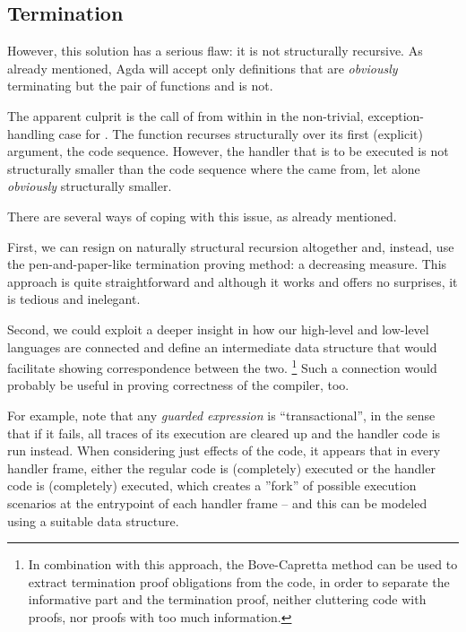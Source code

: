 \subsection{Termination}

However, this solution has a serious flaw: it is not structurally recursive.
As already mentioned, Agda will accept only definitions that are \emph{obviously}
terminating but the pair of functions  and 
is not.

The apparent culprit is the call of  from within
 in the non-trivial, exception-handling case for
. The function  recurses structurally over its
first (explicit) argument, the code sequence. However, the handler that is to
be executed is not structurally smaller than the code sequence where the
 came from, let alone \emph{obviously} structurally smaller.

There are several ways of coping with this issue, as already mentioned.

First, we can resign on naturally structural recursion altogether and, instead,
use the pen-and-paper-like termination proving method: a decreasing measure.
This approach is quite straightforward and although it works and offers no
surprises, it is tedious and inelegant.

Second, we could exploit a deeper insight in how our high-level and low-level
languages are connected and define an intermediate data structure that would
facilitate showing correspondence between the two.%
\footnote{In combination with this approach, the Bove-Capretta method can be used to
extract termination proof obligations from the code, in order to separate the
informative part and the termination proof, neither cluttering code with
proofs, nor proofs with too much information.} Such a connection would probably
be useful in proving correctness of the compiler, too.


For example, note that any \emph{guarded expression} is
``transactional'', in the sense that if it fails, all traces of its execution
are cleared up and the handler code is run instead. When considering just
effects of the code, it appears that in every handler frame, either the regular
code is (completely) executed or the handler code is (completely) executed,
which creates a ''fork'' of possible execution scenarios at the entrypoint of
each handler frame -- and this can be modeled using a suitable data structure.

